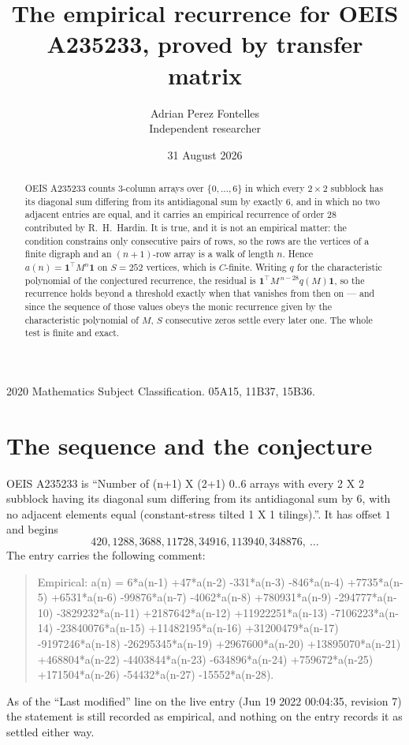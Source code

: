\documentclass[11pt,a4paper]{article}
\title{The empirical recurrence for OEIS A235233, proved by transfer matrix}
\author{Adrian Perez Fontelles\\ \small Independent researcher}
\date{31 August 2026}
\theoremstyle{plain}
\theoremstyle{definition}
\begin{document}
\maketitle

\begin{abstract}
OEIS A235233 counts $3$-column arrays over $\{0,\dots,6\}$ in which every
$2\times2$ subblock has its diagonal sum differing from its antidiagonal sum by
exactly $6$, and in which no two adjacent entries are equal, and it
carries an empirical recurrence of order $28$ contributed by R.~H.~Hardin. It is true,
and it is not an empirical matter: the condition constrains only consecutive pairs of rows,
so the rows are the vertices of a finite digraph and an $(n+1)$-row array is a walk of
length $n$. Hence $a(n)=\mathbf{1}^{\!\top}M^{n}\mathbf{1}$ on $S=252$ vertices, which
is $C$-finite. Writing $q$ for the characteristic polynomial of the conjectured recurrence,
the residual is $\mathbf{1}^{\!\top}M^{\,n-28}q(M)\mathbf{1}$, so the recurrence
holds beyond a threshold exactly when that vanishes from then on --- and since the sequence
of those values obeys the monic recurrence given by the characteristic polynomial of $M$,
$S$ consecutive zeros settle every later one. The whole test is finite and exact.
\end{abstract}

\noindent\small 2020 Mathematics Subject Classification. 05A15, 11B37, 15B36.\normalsize

\section{The sequence and the conjecture}

OEIS A235233 is ``Number of (n+1) X (2+1) 0..6 arrays with every 2 X 2 subblock having its diagonal sum differing from its antidiagonal sum by 6, with no adjacent elements equal (constant-stress tilted 1 X 1 tilings).''. It has offset
$1$ and begins
\[
420, 1288, 3688, 11728, 34916, 113940, 348876,\ \dots
\]
The entry carries the following comment:
\begin{quote}\small
Empirical: a(n) = 6*a(n-1) +47*a(n-2) -331*a(n-3) -846*a(n-4) +7735*a(n-5) +6531*a(n-6) -99876*a(n-7) -4062*a(n-8) +780931*a(n-9) -294777*a(n-10) -3829232*a(n-11) +2187642*a(n-12) +11922251*a(n-13) -7106223*a(n-14) -23840076*a(n-15) +11482195*a(n-16) +31200479*a(n-17) -9197246*a(n-18) -26295345*a(n-19) +2967600*a(n-20) +13895070*a(n-21) +468804*a(n-22) -4403844*a(n-23) -634896*a(n-24) +759672*a(n-25) +171504*a(n-26) -54432*a(n-27) -15552*a(n-28).
\end{quote}
As of the ``Last modified'' line on the live entry (Jun 19 2022 00:04:35, revision 7) the statement is
still recorded as empirical, and nothing on the entry records it as settled either way.
\end{document}
